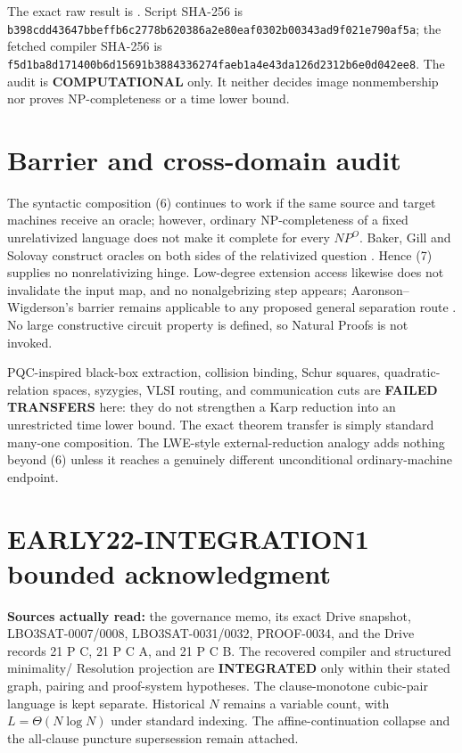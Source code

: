 \documentclass[11pt]{article}
\newcommand{\COMP}{\textbf{COMPUTATIONAL}}
\begin{document}
The exact raw result is
.
Script SHA-256 is
\texttt{b398cdd43647bbeffb6c2778b620386a2e80eaf0302b00343ad9f021e790af5a};
the fetched compiler SHA-256 is
\texttt{f5d1ba8d171400b6d15691b3884336274faeb1a4e43da126d2312b6e0d042ee8}.
The audit is \COMP{} only.  It neither decides image nonmembership nor proves
NP-completeness or a time lower bound.

\section{Barrier and cross-domain audit}
The syntactic composition (6) continues to work if the same source and target
machines receive an oracle; however, ordinary NP-completeness of a fixed
unrelativized language does not make it complete for every $NP^O$.  Baker,
Gill and Solovay construct oracles on both sides of the relativized question
\cite{BGS}.  Hence (7) supplies no nonrelativizing hinge.  Low-degree extension
access likewise does not invalidate the input map, and no nonalgebrizing step
appears; Aaronson--Wigderson's barrier remains applicable to any proposed
general separation route \cite{AW}.  No large constructive circuit property
is defined, so Natural Proofs is not invoked.

PQC-inspired black-box extraction, collision binding, Schur squares,
quadratic-relation spaces, syzygies, VLSI routing, and communication cuts are
\textbf{FAILED TRANSFERS} here: they do not strengthen a Karp reduction into
an unrestricted time lower bound.  The exact theorem transfer is simply
standard many-one composition.  The LWE-style external-reduction analogy adds
nothing beyond (6) unless it reaches a genuinely different unconditional
ordinary-machine endpoint.

\section{EARLY22-INTEGRATION1 bounded acknowledgment}
\textbf{Sources actually read:} the governance memo, its exact Drive snapshot,
LBO3SAT-0007/0008, LBO3SAT-0031/0032, PROOF-0034, and the Drive records 21 P C,
21 P C A, and 21 P C B.  The recovered compiler and structured minimality/
Resolution projection are \textbf{INTEGRATED} only within their stated graph,
pairing and proof-system hypotheses.  The clause-monotone cubic-pair language
is kept separate.  Historical $N$ remains a variable count, with
$L=\Theta(N\log N)$ under standard indexing.  The affine-continuation collapse
and the all-clause puncture supersession remain attached.
\end{document}
